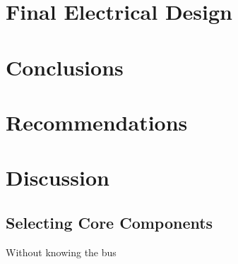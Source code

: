 \documentclass[12pt]{article}
\begin{document}
	\section{Final Electrical Design}

  \section{Conclusions}

  \section{Recommendations}

  \section{Discussion}

  \subsection{Selecting Core Components\label{sec:select-core-comp}}

  Without knowing the bus 
	
	
    \printglossaries
    
    \printbibliography[heading=bibintoc]
	
\end{document}
